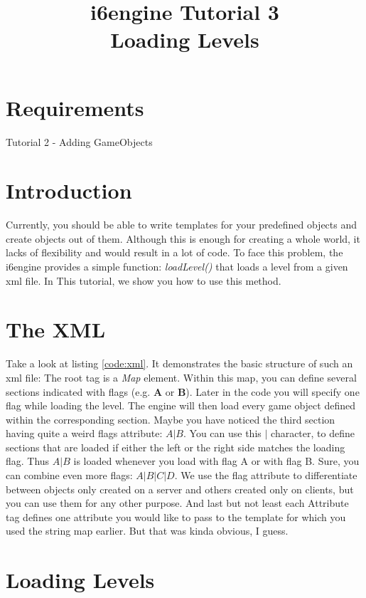 \documentclass{article}
\title{i6engine Tutorial 3 \\ Loading Levels}
\begin{document}
\section{Requirements}

Tutorial 2 - Adding GameObjects

\section{Introduction}

Currently, you should be able to write templates for your predefined objects and create objects out of them. Although this is enough for creating a whole world, it lacks of flexibility and would result in a lot of code. To face this problem, the i6engine provides a simple function: \textit{loadLevel()} that loads a level from a given xml file. In This tutorial, we show you how to use this method.

\section{The XML}

Take a look at listing \ref{code:xml}. It demonstrates the basic structure of such an xml file: The root tag is a \textit{Map} element. Within this map, you can define several sections indicated with flags (e.g. \textbf{A} or \textbf{B}). Later in the code you will specify one flag while loading the level. The engine will then load every game object defined within the corresponding section. Maybe you have noticed the third section having quite a weird flags attribute: \textbf{$A|B$}. You can use this \textbf{$|$} character, to define sections that are loaded if either the left or the right side matches the loading flag. Thus \textbf{$A|B$} is loaded whenever you load with flag A or with flag B. Sure, you can combine even more flags: \textbf{$A|B|C|D$}. We use the flag attribute to differentiate between objects only created on a server and others created only on clients, but you can use them for any other purpose. And last but not least each Attribute tag defines one attribute you would like to pass to the template for which you used the string map earlier. But that was kinda obvious, I guess.



\section{Loading Levels}
\end{document}
